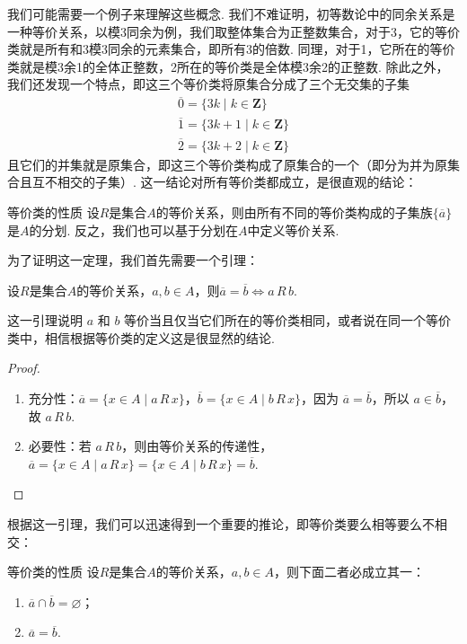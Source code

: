 我们可能需要一个例子来理解这些概念. 我们不难证明，初等数论中的同余关系是一种等价关系，以模3同余为例，我们取整体集合为正整数集合，对于3，它的等价类就是所有和3模3同余的元素集合，即所有3的倍数. 同理，对于1，它所在的等价类就是模3余1的全体正整数，2所在的等价类是全体模3余2的正整数. 除此之外，我们还发现一个特点，即这三个等价类将原集合分成了三个无交集的子集
\begin{gather*}
    \overline{0}=\{3k\mid k\in\mathbf{Z}\} \\
    \overline{1}=\{3k+1\mid k\in\mathbf{Z}\} \\
    \overline{2}=\{3k+2\mid k\in\mathbf{Z}\}
\end{gather*}
且它们的并集就是原集合，即这三个等价类构成了原集合的一个（即分为并为原集合且互不相交的子集）. 这一结论对所有等价类都成立，是很直观的结论：
\begin{theorem}{}{等价类的性质}
    设$R$是集合$A$的等价关系，则由所有不同的等价类构成的子集族$\{\overline{a}\}$是$A$的分划. 反之，我们也可以基于分划在$A$中定义等价关系.
\end{theorem}

为了证明这一定理，我们首先需要一个引理：
\begin{lemma}{}{}
    设$R$是集合$A$的等价关系，$a,b\in A$，则$\overline{a}=\overline{b}\iff a\,R\,b$.
\end{lemma}
这一引理说明 $a$ 和 $b$ 等价当且仅当它们所在的等价类相同，或者说在同一个等价类中，相信根据等价类的定义这是很显然的结论.

\begin{proof}
\begin{enumerate}
    \item 充分性：$\overline{a}=\{ x \in A \mid a \,R\, x \}$，$\overline{b}=\{ x \in A \mid b \,R\, x \}$，因为 $\overline{a} = \overline{b}$，所以 $a \in \overline{b}$，故 $a \,R\, b$.
    \item 必要性：若 $a \,R\, b$，则由等价关系的传递性，$\overline{a} = \{ x \in A \mid a \,R\, x \} = \{ x \in A \mid b \,R\, x \} = \overline{b}$.
\end{enumerate}
\end{proof}

根据这一引理，我们可以迅速得到一个重要的推论，即等价类要么相等要么不相交：
\begin{corollary}{}{等价类的性质}
    设$R$是集合$A$的等价关系，$a,b\in A$，则下面二者必成立其一：
    \begin{enumerate}
        \item $\overline{a}\cap\overline{b}=\varnothing$；

        \item $\overline{a}=\overline{b}$.
    \end{enumerate}
\end{corollary}


